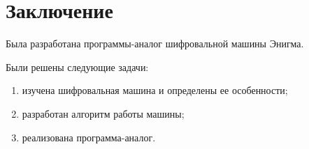 \section*{Заключение}

Была разработана программы-аналог шифровальной машины Энигма.

Были решены следующие задачи:
\begin{enumerate}
    \item изучена шифровальная машина и определены ее особенности;
    \item разработан алгоритм работы машины;
    \item реализована программа-аналог.
\end{enumerate}

